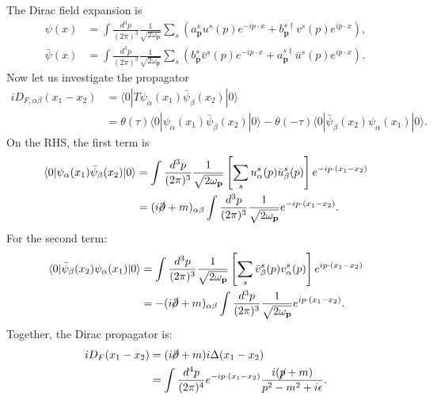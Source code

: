 The Dirac field expansion is
\begin{equation}
\begin{aligned}
	\psi(x) &=\int \frac{d^{3} p}{(2 \pi)^{3}} \frac{1}{\sqrt{2 \omega_{\mathbf{p}}}} 
		\sum_{s}\left(a_{\mathbf{p}}^{s} u^{s}(p) e^{-i p \cdot x}
		+b_{\mathbf{p}}^{s \dagger} v^{s}(p) e^{i p \cdot x}\right), \\
	\bar{\psi}(x) &=\int \frac{d^{3} p}{(2 \pi)^{3}} \frac{1}{\sqrt{2 \omega_{\mathbf{p}}}} 
		\sum_{s}\left(b_{\mathbf{p}}^{s} \bar{v}^{s}(p) e^{-i p \cdot x}
		+a_{\mathbf{p}}^{s \dagger} \bar{u}^{s}(p) e^{i p \cdot x}\right).
\end{aligned}
\end{equation}
Now let us investigate the propagator
\begin{equation}
\begin{aligned}
	iD_{F,\alpha\beta}(x_1-x_2) &= \langle0|T\psi_\alpha(x_1)\bar\psi_\beta(x_2)|0\rangle \\
	&= \theta(\tau) \langle0|\psi_\alpha(x_1)\bar\psi_\beta(x_2)|0\rangle - \theta(-\tau) \langle0|\bar\psi_\beta(x_2)\psi_\alpha(x_1)|0\rangle.
\end{aligned}
\end{equation}
On the RHS, the first term is
\begin{equation*}
\begin{aligned}
	\langle0|\psi_\alpha(x_1)\bar\psi_\beta(x_2)|0\rangle 
	&= \int \frac{d^{3} p}{(2 \pi)^{3}} \frac{1}{\sqrt{2 \omega_{\mathbf{p}}}} \left[\sum_s u_\alpha^s(p)\bar u_\beta^s(p)\right]e^{-i p\cdot (x_1-x_2)} \\
	&= (i\cancel \partial+m)_{\alpha\beta}\int \frac{d^{3} p}{(2 \pi)^{3}} \frac{1}{\sqrt{2 \omega_{\mathbf{p}}}} e^{-i p\cdot (x_1-x_2)}.
\end{aligned}
\end{equation*}
For the second term:
\begin{equation*}
\begin{aligned}
	\langle0|\bar\psi_\beta(x_2)\psi_\alpha(x_1)|0\rangle
	&= \int \frac{d^{3} p}{(2 \pi)^{3}} \frac{1}{\sqrt{2 \omega_{\mathbf{p}}}} \left[\sum_s \bar v_\beta^s(p)v_\alpha^s(p)\right]e^{i p\cdot (x_1-x_2)} \\
	&= -(i\cancel \partial + m)_{\alpha\beta}\int \frac{d^{3} p}{(2 \pi)^{3}} \frac{1}{\sqrt{2 \omega_{\mathbf{p}}}} e^{i p\cdot (x_1-x_2)}.
\end{aligned}
\end{equation*}
Together, the Dirac propagator is:
\begin{equation*}
\begin{aligned}
	iD_F(x_1-x_2) &= (i\cancel \partial+m)i\Delta(x_1-x_2) \\
	&= \int\frac{d^{4} p}{(2\pi)^{4}} e^{-i p\cdot (x_1-x_2)}\frac{i(\cancel p+m)}{p^2-m^2+i\epsilon}.
\end{aligned}
\end{equation*}



